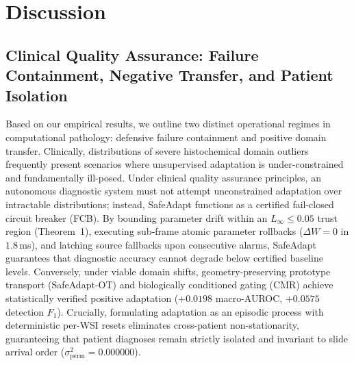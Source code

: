 \documentclass[journal]{IEEEtran}
\begin{document}
\begin{table}[t]
\centering
\caption{Clinical Nottingham Histological Mitotic Grade Concordance Across 50 Cases on Scanner 3 (Mean over 3 Seeds).}
\label{tab:nottingham}
\scriptsize
\renewcommand{\arraystretch}{0.92}
\setlength{\tabcolsep}{3.5pt}
\end{table}

\section{Discussion}
\subsection{Clinical Quality Assurance: Failure Containment, Negative Transfer, and Patient Isolation}
Based on our empirical results, we outline two distinct operational regimes in computational pathology: defensive failure containment and positive domain transfer. Clinically, distributions of severe histochemical domain outliers frequently present scenarios where unsupervised adaptation is under-constrained and fundamentally ill-posed. Under clinical quality assurance principles, an autonomous diagnostic system must not attempt unconstrained adaptation over intractable distributions; instead, SafeAdapt functions as a certified fail-closed circuit breaker (FCB). By bounding parameter drift within an $L_\infty \le 0.05$ trust region (Theorem~1), executing sub-frame atomic parameter rollbacks ($\Delta W = 0$ in $1.8$\,ms), and latching source fallbacks upon consecutive alarms, SafeAdapt guarantees that diagnostic accuracy cannot degrade below certified baseline levels. Conversely, under viable domain shifts, geometry-preserving prototype transport (SafeAdapt-OT) and biologically conditioned gating (CMR) achieve statistically verified positive adaptation ($+0.0198$ macro-AUROC, $+0.0575$ detection $F_1$). Crucially, formulating adaptation as an episodic process with deterministic per-WSI resets eliminates cross-patient non-stationarity, guaranteeing that patient diagnoses remain strictly isolated and invariant to slide arrival order ($\sigma^2_{\mathrm{perm}} = 0.000000$).
\end{document}
